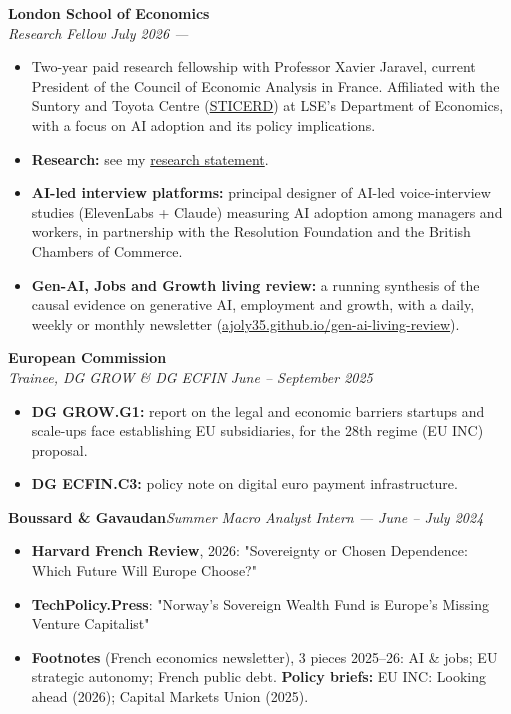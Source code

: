 \documentclass[10.5pt,a4paper]{article}
\newcommand{\cvsection}[1]{\vspace{3pt}\noindent{\bfseries #1}\par\vspace{-7pt}\noindent\hrulefill\par\vspace{1pt}}
\newcommand{\entry}[2]{\vspace{2pt}\noindent\textbf{#1}\hfill\textit{#2}\\[0pt]}
\newenvironment{tight}{\begin{itemize}\setlength{\itemsep}{0pt}\setlength{\parskip}{0pt}\setlength{\topsep}{0pt}\setlength{\partopsep}{0pt}}{\end{itemize}}
\begin{document}
\entry{London School of Economics}{}
\textit{Research Fellow} \hfill \textit{July 2026 ---}
\begin{tight}
\item Two-year paid research fellowship with Professor Xavier Jaravel, current President of the Council of Economic Analysis in France. Affiliated with the Suntory and Toyota Centre (\href{https://sticerd.lse.ac.uk/_new/people/person.asp?id=11818}{STICERD}) at LSE's Department of Economics, with a focus on AI adoption and its policy implications.
\item \textbf{Research:} see my \href{https://ajoly35.github.io/assets/research-statement.pdf}{research statement}.
\item \textbf{AI-led interview platforms:} principal designer of AI-led voice-interview studies (ElevenLabs + Claude) measuring AI adoption among managers and workers, in partnership with the Resolution Foundation and the British Chambers of Commerce.
\item \textbf{Gen-AI, Jobs and Growth living review:} a running synthesis of the causal evidence on generative AI, employment and growth, with a daily, weekly or monthly newsletter (\href{https://ajoly35.github.io/gen-ai-living-review/}{ajoly35.github.io/gen-ai-living-review}).
\end{tight}

\entry{European Commission}{}
\textit{Trainee, DG GROW \& DG ECFIN} \hfill \textit{June -- September 2025}
\begin{tight}
\item \textbf{DG GROW.G1:} report on the legal and economic barriers startups and scale-ups face establishing EU subsidiaries, for the 28th regime (EU INC) proposal.
\item \textbf{DG ECFIN.C3:} policy note on digital euro payment infrastructure.
\end{tight}

\entry{Boussard \& Gavaudan}{Summer Macro Analyst Intern --- June -- July 2024}

\cvsection{Publications \& Writing}
\begin{tight}
\item \textbf{Harvard French Review}, 2026: "Sovereignty or Chosen Dependence: Which Future Will Europe Choose?"
\item \textbf{TechPolicy.Press}: "Norway's Sovereign Wealth Fund is Europe's Missing Venture Capitalist"
\item \textbf{Footnotes} (French economics newsletter), 3 pieces 2025--26: AI \& jobs; EU strategic autonomy; French public debt. \textbf{Policy briefs:} EU INC: Looking ahead (2026); Capital Markets Union (2025).
\end{tight}
\end{document}
